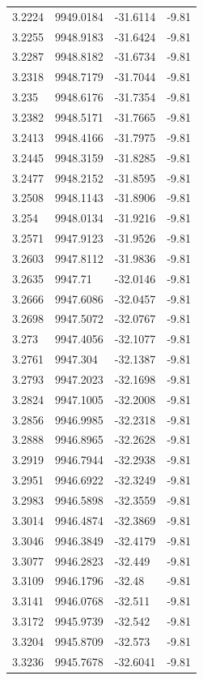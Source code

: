 \begin{table}[H]
\begin{tabular}{llll}
3.2224 & 9949.0184 & -31.6114 & -9.81 \\
3.2255 & 9948.9183 & -31.6424 & -9.81 \\
3.2287 & 9948.8182 & -31.6734 & -9.81 \\
3.2318 & 9948.7179 & -31.7044 & -9.81 \\
3.235 & 9948.6176 & -31.7354 & -9.81 \\
3.2382 & 9948.5171 & -31.7665 & -9.81 \\
3.2413 & 9948.4166 & -31.7975 & -9.81 \\
3.2445 & 9948.3159 & -31.8285 & -9.81 \\
3.2477 & 9948.2152 & -31.8595 & -9.81 \\
3.2508 & 9948.1143 & -31.8906 & -9.81 \\
3.254 & 9948.0134 & -31.9216 & -9.81 \\
3.2571 & 9947.9123 & -31.9526 & -9.81 \\
3.2603 & 9947.8112 & -31.9836 & -9.81 \\
3.2635 & 9947.71 & -32.0146 & -9.81 \\
3.2666 & 9947.6086 & -32.0457 & -9.81 \\
3.2698 & 9947.5072 & -32.0767 & -9.81 \\
3.273 & 9947.4056 & -32.1077 & -9.81 \\
3.2761 & 9947.304 & -32.1387 & -9.81 \\
3.2793 & 9947.2023 & -32.1698 & -9.81 \\
3.2824 & 9947.1005 & -32.2008 & -9.81 \\
3.2856 & 9946.9985 & -32.2318 & -9.81 \\
3.2888 & 9946.8965 & -32.2628 & -9.81 \\
3.2919 & 9946.7944 & -32.2938 & -9.81 \\
3.2951 & 9946.6922 & -32.3249 & -9.81 \\
3.2983 & 9946.5898 & -32.3559 & -9.81 \\
3.3014 & 9946.4874 & -32.3869 & -9.81 \\
3.3046 & 9946.3849 & -32.4179 & -9.81 \\
3.3077 & 9946.2823 & -32.449 & -9.81 \\
3.3109 & 9946.1796 & -32.48 & -9.81 \\
3.3141 & 9946.0768 & -32.511 & -9.81 \\
3.3172 & 9945.9739 & -32.542 & -9.81 \\
3.3204 & 9945.8709 & -32.573 & -9.81 \\
3.3236 & 9945.7678 & -32.6041 & -9.81 \\

\end{tabular}
\end{table}
